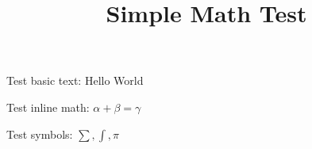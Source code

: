 \documentclass{article}
\title{Simple Math Test}
\begin{document}
\maketitle

Test basic text: Hello World

Test inline math: $\alpha + \beta = \gamma$

Test symbols: $\sum, \int, \pi$
\end{document}
